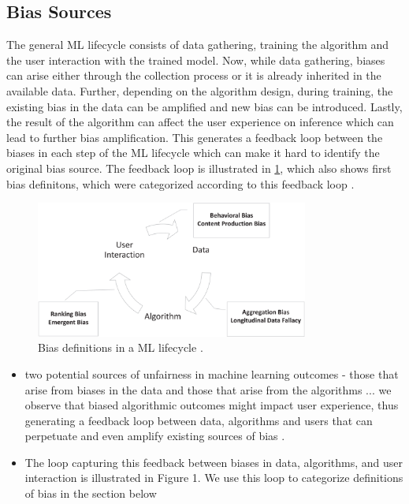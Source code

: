 \documentclass[12pt, a4paper, oneside]{book}   	%
\newif\ifrawcitationactive
\newcommand{\rawcitationusedstart}{\color{violet}}
\newcommand{\rawcitationusedend}{%
	\ifrawcitationactive
	\color{purple}  %
	\else
	\color{black}  %
	\fi
}
\begin{document}
			\subsection{Bias Sources}
			The general ML lifecycle consists of data gathering, training the algorithm and the user interaction with the trained model. Now, while data gathering, biases can arise either through the collection process or it is already inherited in the available data. Further, depending on the algorithm design, during training, the existing bias in the data can be amplified and new bias can be introduced. Lastly, the result of the algorithm can affect the user experience on inference which can lead to further bias amplification. This generates a feedback loop between the biases in each step of the ML lifecycle which can make it hard to identify the original bias source. The feedback loop is illustrated in \ref{fig:bias_definitions_ML_lifecycle}, which also shows first bias definitons, which were categorized according to this feedback loop \autocite{Mehrabi_2021}.
			
			\begin{figure}[H]
				\centering
				\includegraphics[width=0.8\textwidth]{figures/BiasCategoriesInMLLifecycle.png}
				\caption{Bias definitions in a ML lifecycle \autocite{Mehrabi_2021}.}
				\label{fig:bias_definitions_ML_lifecycle}
			\end{figure}
			
			\rawcitationusedstart
			\begin{itemize}
				\item two potential sources of unfairness in machine learning outcomes - those that arise from biases in the data and those that arise from the algorithms ... we observe that biased algorithmic outcomes might impact user experience, thus generating a feedback loop between data, algorithms and users that can perpetuate and even amplify existing sources of bias \autocite{Mehrabi_2021}.
				\item The loop capturing this feedback between biases in data, algorithms, and user interaction is illustrated in Figure 1. We use this loop to categorize definitions of bias in the section below \autocite{Mehrabi_2021}
			\end{itemize}
			\rawcitationusedend
			
\end{document}
